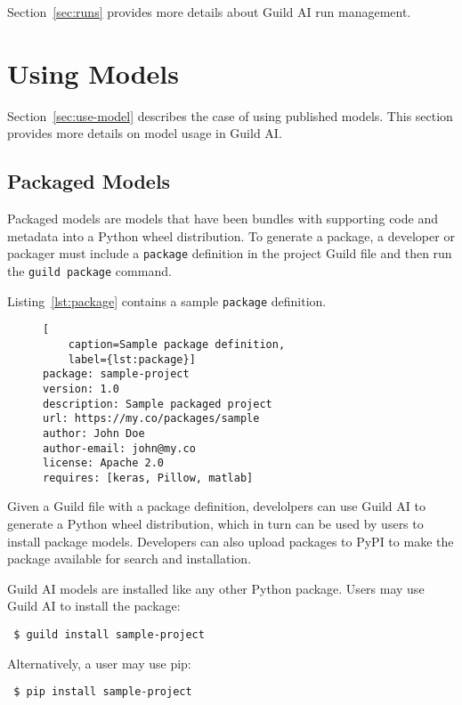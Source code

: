 \documentclass{article}
\begin{document}
Section~\ref{sec:runs} provides more details about Guild AI run
management.

\section{Using Models}

Section~\ref{sec:use-model} describes the case of using published
models. This section provides more details on model usage in Guild AI.

\subsection{Packaged Models}

Packaged models are models that have been bundles with supporting code
and metadata into a Python wheel distribution. To generate a package,
a developer or packager must include a \verb|package| definition in
the project Guild file and then run the \verb|guild package| command.

Listing~\ref{lst:package} contains a sample \verb|package| definition.

\begin{figure}
\begin{lstlisting}[
    caption=Sample package definition,
    label={lst:package}]
package: sample-project
version: 1.0
description: Sample packaged project
url: https://my.co/packages/sample
author: John Doe
author-email: john@my.co
license: Apache 2.0
requires: [keras, Pillow, matlab]
\end{lstlisting}
\end{figure}

Given a Guild file with a package definition, develolpers can use
Guild AI to generate a Python wheel distribution, which in turn can be
used by users to install package models. Developers can also upload
packages to PyPI to make the package available for search and
installation.

Guild AI models are installed like any other Python package. Users may
use Guild AI to install the package:

{\footnotesize
\begin{verbatim}
 $ guild install sample-project
\end{verbatim}}

Alternatively, a user may use pip:

{\footnotesize
\begin{verbatim}
 $ pip install sample-project
\end{verbatim}}
\end{document}
